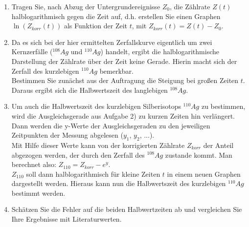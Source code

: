 \begin{enumerate}
	\item Tragen Sie, nach Abzug der Untergrundereignisse $Z_0$, die Zählrate $Z(t)$ halblogarithmisch gegen die Zeit auf, d.h. erstellen Sie einen Graphen $\ln(Z_{korr}(t))$ als Funktion der Zeit $t$, mit $Z_{korr}(t) = Z(t) -Z_0$.
	\item Da es sich bei der hier ermittelten Zerfallskurve eigentlich um zwei Kernzerfälle ($^{108}Ag$ und $^{110}Ag$) handelt, ergibt die halblogarithmische Darstellung der Zählrate über der Zeit keine Gerade. Hierin macht sich der Zerfall des kurzlebigen $^{110}Ag$ bemerkbar.\\
		Bestimmen Sie zunächst aus der Auftragung die Steigung bei großen Zeiten $t$. Daraus ergibt sich die Halbwertszeit des langlebigen $^{108}Ag$.
	\item Um auch die Halbwertszeit des kurzlebigen Silberisotops $^{110}Ag$ zu bestimmen, wird die Ausgleichsgerade aus Aufgabe 2) zu kurzen Zeiten hin verlängert. Dann werden die y-Werte der Ausgleichsgeraden zu den jeweiligen Zeitpunkten der Messung abgelesen ($y_1$, $y_2$, ...).\\
	Mit Hilfe dieser Werte kann von der korrigierten Zählrate $Z_{korr}$ der Anteil abgezogen werden, der durch den Zerfall des $^{108}Ag$ zustande kommt. Man berechnet also: $Z_{110} = Z_{korr} - e^y$.\\
	$Z_{110}$ soll dann halblogarithmisch für kleine Zeiten $t$ in einem neuen Graphen dargestellt werden. Hieraus kann nun die Halbwertszeit des kurzlebigen $^{110}Ag$ bestimmt werden.
	\item Schätzen Sie die Fehler auf die beiden Halbwertzeiten ab und vergleichen Sie Ihre Ergebnisse mit Literaturwerten.
\end{enumerate}